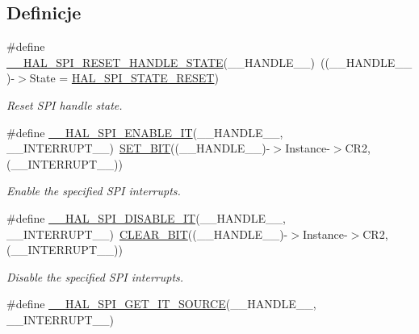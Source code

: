 \subsection*{Definicje}
\begin{DoxyCompactItemize}
\item 
\#define \hyperlink{group___s_p_i___exported___macros_ga0d846f9517715960873e854b4a0790b0}{\+\_\+\+\_\+\+H\+A\+L\+\_\+\+S\+P\+I\+\_\+\+R\+E\+S\+E\+T\+\_\+\+H\+A\+N\+D\+L\+E\+\_\+\+S\+T\+A\+TE}(\+\_\+\+\_\+\+H\+A\+N\+D\+L\+E\+\_\+\+\_\+)~((\+\_\+\+\_\+\+H\+A\+N\+D\+L\+E\+\_\+\+\_\+)-\/$>$State = \hyperlink{group___s_p_i___exported___types_gga8891cb64e76198a860172d94c638c9b4adbc218df2c9841b561282b40b3ded69d}{H\+A\+L\+\_\+\+S\+P\+I\+\_\+\+S\+T\+A\+T\+E\+\_\+\+R\+E\+S\+ET})
\begin{DoxyCompactList}\small\item\em Reset S\+PI handle state. \end{DoxyCompactList}\item 
\#define \hyperlink{group___s_p_i___exported___macros_ga76064652f6f56d8868720b5541e854f5}{\+\_\+\+\_\+\+H\+A\+L\+\_\+\+S\+P\+I\+\_\+\+E\+N\+A\+B\+L\+E\+\_\+\+IT}(\+\_\+\+\_\+\+H\+A\+N\+D\+L\+E\+\_\+\+\_\+,  \+\_\+\+\_\+\+I\+N\+T\+E\+R\+R\+U\+P\+T\+\_\+\+\_\+)~\hyperlink{group___exported__macro_ga26474f43799fbade9cf300e21dd3a91a}{S\+E\+T\+\_\+\+B\+IT}((\+\_\+\+\_\+\+H\+A\+N\+D\+L\+E\+\_\+\+\_\+)-\/$>$Instance-\/$>$C\+R2, (\+\_\+\+\_\+\+I\+N\+T\+E\+R\+R\+U\+P\+T\+\_\+\+\_\+))
\begin{DoxyCompactList}\small\item\em Enable the specified S\+PI interrupts. \end{DoxyCompactList}\item 
\#define \hyperlink{group___s_p_i___exported___macros_ga47fa7321c5755bfbff1a7229fbe5b21c}{\+\_\+\+\_\+\+H\+A\+L\+\_\+\+S\+P\+I\+\_\+\+D\+I\+S\+A\+B\+L\+E\+\_\+\+IT}(\+\_\+\+\_\+\+H\+A\+N\+D\+L\+E\+\_\+\+\_\+,  \+\_\+\+\_\+\+I\+N\+T\+E\+R\+R\+U\+P\+T\+\_\+\+\_\+)~\hyperlink{group___exported__macro_ga133aae6fc0d41bffab39ab223a7001de}{C\+L\+E\+A\+R\+\_\+\+B\+IT}((\+\_\+\+\_\+\+H\+A\+N\+D\+L\+E\+\_\+\+\_\+)-\/$>$Instance-\/$>$C\+R2, (\+\_\+\+\_\+\+I\+N\+T\+E\+R\+R\+U\+P\+T\+\_\+\+\_\+))
\begin{DoxyCompactList}\small\item\em Disable the specified S\+PI interrupts. \end{DoxyCompactList}\item 
\#define \hyperlink{group___s_p_i___exported___macros_gabdaab061e4603331a0ec4b9d651df0b5}{\+\_\+\+\_\+\+H\+A\+L\+\_\+\+S\+P\+I\+\_\+\+G\+E\+T\+\_\+\+I\+T\+\_\+\+S\+O\+U\+R\+CE}(\+\_\+\+\_\+\+H\+A\+N\+D\+L\+E\+\_\+\+\_\+,  \+\_\+\+\_\+\+I\+N\+T\+E\+R\+R\+U\+P\+T\+\_\+\+\_\+)

\end{DoxyCompactItemize}
